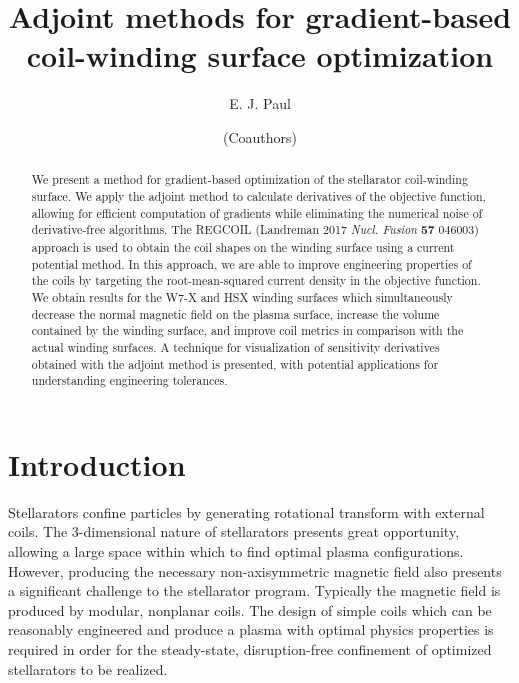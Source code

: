 \documentclass[aps,unsortedaddress]{revtex4-1}
\begin{document}
\title{Adjoint methods for gradient-based coil-winding surface optimization}
\author{E. J. Paul}

\author{(Coauthors)}

\begin{abstract}
We present a method for gradient-based optimization of the stellarator coil-winding surface. We apply the adjoint method to calculate derivatives of the objective function, allowing for efficient computation of gradients while eliminating the numerical noise of derivative-free algorithms. The REGCOIL (Landreman 2017 \textit{Nucl. Fusion} \textbf{57} 046003) approach is used to obtain the coil shapes on the winding surface using a current potential method. In this approach, we are able to improve engineering properties of the coils by targeting the root-mean-squared current density in the objective function. We obtain results for the W7-X and HSX winding surfaces which simultaneously decrease the normal magnetic field on the plasma surface,  increase the volume contained by the winding surface, and improve coil metrics in comparison with the actual winding surfaces. A technique for visualization of sensitivity derivatives obtained with the adjoint method is presented, with potential applications for understanding engineering tolerances. 
\end{abstract}

\maketitle

\section{Introduction}

Stellarators confine particles by generating rotational transform with external coils. The 3-dimensional nature of stellarators presents great opportunity, allowing a large space within which to find optimal plasma configurations. However, producing the necessary non-axisymmetric magnetic field also presents a significant challenge to the stellarator program. Typically the magnetic field is produced by modular, nonplanar coils. The design of simple coils which can be reasonably engineered and produce a plasma with optimal physics properties is required in order for the steady-state, disruption-free confinement of optimized stellarators to be realized. 
\end{document}
